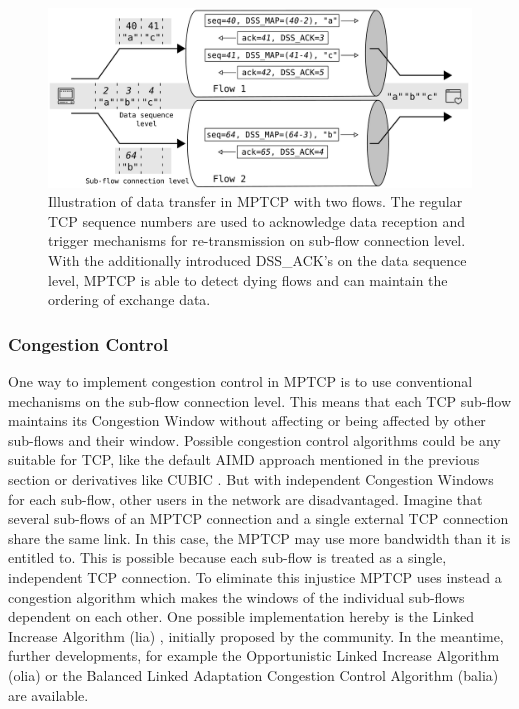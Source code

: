 \begin{figure}
	\begin{center}
		\def\svgwidth{1\textwidth}
		\includegraphics[scale=0.2]{../illustrations/importantConcepts/MPTCPDataTransfer.pdf}  
		\caption[Caption for the list of figures.]{Illustration of data transfer in MPTCP with two flows. The regular TCP sequence numbers are used to acknowledge data reception and trigger mechanisms for re-transmission on sub-flow connection level. With the additionally introduced DSS\_ACK's on the data sequence level, MPTCP is able to detect dying flows and can maintain the ordering of exchange data.}
		\label{fig:MPTCPDataTransfer}
	\end{center}
\end{figure}

\subsubsection{Congestion Control}

One way to implement congestion control in MPTCP is to use conventional mechanisms on the sub-flow connection level. This means that each TCP sub-flow maintains its Congestion Window without affecting or being affected by other sub-flows and their window. Possible congestion control algorithms could be any suitable for TCP, like the default AIMD approach \cite{rfc5681} mentioned in the previous section or derivatives like CUBIC \cite{rfc8312}. But with independent Congestion Windows for each sub-flow, other users in the network are disadvantaged. Imagine that several sub-flows of an MPTCP connection and a single external TCP connection share the same link. In this case, the MPTCP may use more bandwidth than it is entitled to.  This is possible because each sub-flow is treated as a single, independent TCP connection. To eliminate this injustice MPTCP uses instead a congestion algorithm which makes the windows of the individual sub-flows dependent on each other. One possible implementation hereby is the Linked Increase Algorithm (lia) \cite{rfc6356}, initially proposed by the community.  In the meantime, further developments, for example the  Opportunistic Linked Increase Algorithm (olia) \cite{khalili-mptcp-congestion-control-05}  or the Balanced Linked Adaptation Congestion Control Algorithm (balia) \cite{walid-mptcp-congestion-control-04} are available.

